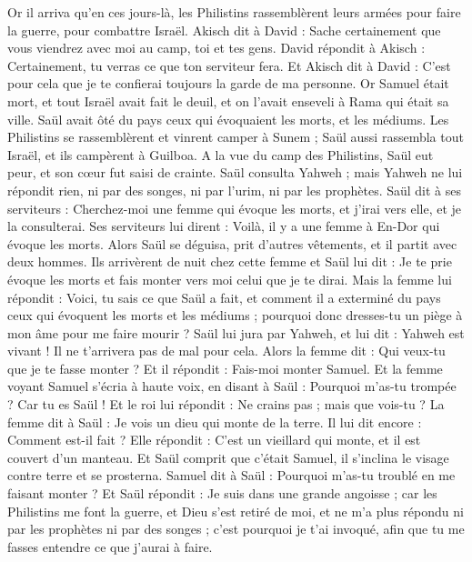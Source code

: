 \begin{multicols}{2}
\VerseOne{}Or il arriva qu'en ces jours-là, les Philistins rassemblèrent leurs armées pour faire la guerre, pour combattre Israël. Akisch dit à David : Sache certainement que vous viendrez avec moi au camp, toi et tes gens.
David répondit à Akisch : Certainement, tu verras ce que ton serviteur fera. Et Akisch dit à David : C'est pour cela que je te confierai toujours la garde de ma personne.
Or Samuel était mort, et tout Israël avait fait le deuil, et on l'avait enseveli à Rama qui était sa ville. Saül avait ôté du pays ceux qui évoquaient les morts, et les médiums.
Les Philistins se rassemblèrent et vinrent camper à Sunem ; Saül aussi rassembla tout Israël, et ils campèrent à Guilboa.
A la vue du camp des Philistins, Saül eut peur, et son cœur fut saisi de crainte.
Saül consulta Yahweh ; mais Yahweh ne lui répondit rien, ni par des songes, ni par l'urim, ni par les prophètes.
Saül dit à ses serviteurs : Cherchez-moi une femme qui évoque les morts, et j'irai vers elle, et je la consulterai. Ses serviteurs lui dirent : Voilà, il y a une femme à En-Dor qui évoque les morts.
Alors Saül se déguisa, prit d'autres vêtements, et il partit avec deux hommes. Ils arrivèrent de nuit chez cette femme et Saül lui dit : Je te prie évoque les morts et fais monter vers moi celui que je te dirai.
Mais la femme lui répondit : Voici, tu sais ce que Saül a fait, et comment il a exterminé du pays ceux qui évoquent les morts et les médiums ; pourquoi donc dresses-tu un piège à mon âme pour me faire mourir ?
Saül lui jura par Yahweh, et lui dit : Yahweh est vivant ! Il ne t'arrivera pas de mal pour cela.
Alors la femme dit : Qui veux-tu que je te fasse monter ? Et il répondit : Fais-moi monter Samuel.
Et la femme voyant Samuel s'écria à haute voix, en disant à Saül : Pourquoi m'as-tu trompée ? Car tu es Saül !
Et le roi lui répondit : Ne crains pas ; mais que vois-tu ? La femme dit à Saül : Je vois un dieu qui monte de la terre.
Il lui dit encore : Comment est-il fait ? Elle répondit : C'est un vieillard qui monte, et il est couvert d'un manteau. Et Saül comprit que c'était Samuel, il s'inclina le visage contre terre et se prosterna.
Samuel dit à Saül : Pourquoi m'as-tu troublé en me faisant monter ? Et Saül répondit : Je suis dans une grande angoisse ; car les Philistins me font la guerre, et Dieu s'est retiré de moi, et ne m'a plus répondu ni par les prophètes ni par des songes ; c'est pourquoi je t'ai invoqué, afin que tu me fasses entendre ce que j'aurai à faire.

\end{multicols}
